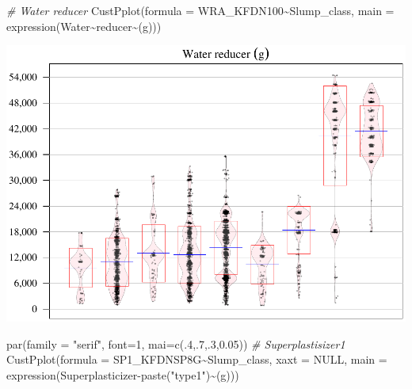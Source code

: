 \documentclass[
]{article}
\newenvironment{Shaded}{\begin{snugshade}}{\end{snugshade}}
\newcommand{\AttributeTok}[1]{\textcolor[rgb]{0.77,0.63,0.00}{#1}}
\newcommand{\CommentTok}[1]{\textcolor[rgb]{0.56,0.35,0.01}{\textit{#1}}}
\newcommand{\ConstantTok}[1]{\textcolor[rgb]{0.00,0.00,0.00}{#1}}
\newcommand{\DecValTok}[1]{\textcolor[rgb]{0.00,0.00,0.81}{#1}}
\newcommand{\FloatTok}[1]{\textcolor[rgb]{0.00,0.00,0.81}{#1}}
\newcommand{\FunctionTok}[1]{\textcolor[rgb]{0.00,0.00,0.00}{#1}}
\newcommand{\NormalTok}[1]{#1}
\newcommand{\SpecialCharTok}[1]{\textcolor[rgb]{0.00,0.00,0.00}{#1}}
\newcommand{\StringTok}[1]{\textcolor[rgb]{0.31,0.60,0.02}{#1}}
\begin{document}
\begin{Shaded}
\begin{Highlighting}[]
\CommentTok{\# Water reducer}
\FunctionTok{CustPplot}\NormalTok{(}\AttributeTok{formula =}\NormalTok{ WRA\_KFDN100}\SpecialCharTok{\textasciitilde{}}\NormalTok{Slump\_class,}
          \AttributeTok{main =} \FunctionTok{expression}\NormalTok{(Water}\SpecialCharTok{\textasciitilde{}}\NormalTok{reducer}\SpecialCharTok{\textasciitilde{}}\NormalTok{(g)))}
\end{Highlighting}
\end{Shaded}

\begin{center}\includegraphics{sl-inf-cairs-2301_files/figure-latex/dataInsights-8} \end{center}

\begin{Shaded}
\begin{Highlighting}[]
\FunctionTok{par}\NormalTok{(}\AttributeTok{family =} \StringTok{"serif"}\NormalTok{, }\AttributeTok{font=}\DecValTok{1}\NormalTok{, }\AttributeTok{mai=}\FunctionTok{c}\NormalTok{(.}\DecValTok{4}\NormalTok{,.}\DecValTok{7}\NormalTok{,.}\DecValTok{3}\NormalTok{,}\FloatTok{0.05}\NormalTok{))}
\CommentTok{\# Superplastisizer1}
\FunctionTok{CustPplot}\NormalTok{(}\AttributeTok{formula =}\NormalTok{ SP1\_KFDNSP8G}\SpecialCharTok{\textasciitilde{}}\NormalTok{Slump\_class, }\AttributeTok{xaxt =} \ConstantTok{NULL}\NormalTok{,}
          \AttributeTok{main =} \FunctionTok{expression}\NormalTok{(Superplasticizer}\SpecialCharTok{{-}}\FunctionTok{paste}\NormalTok{(}\StringTok{"type1"}\NormalTok{)}\SpecialCharTok{\textasciitilde{}}\NormalTok{(g)))}
\end{Highlighting}
\end{Shaded}
\end{document}
